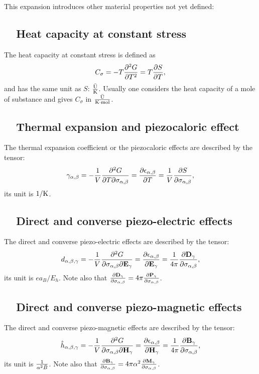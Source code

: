 \documentclass[12pt,a4paper,twoside]{report}
\begin{document}
{This expansion introduces other material properties not yet defined:
\subsection{\color{web-blue}\ \ Heat capacity at constant stress}
The heat capacity at constant stress is defined as
\begin{equation}
C_\sigma= - T {\partial^2 G \over \partial T^2} = 
T {\partial S \over \partial T},
\end{equation}
and has the same unit as $S$: ${\rm \bar U} \over {\rm K}$. Usually one considers the heat
capacity of a mole of substance and gives $C_\sigma$ in 
${{\rm \bar U} \over {\rm K} \cdot {\rm mol}}$.

\subsection{\color{web-blue}\ \ Thermal expansion and piezocaloric effect}
The thermal expansion coefficient or the piezocaloric effects are
described by the tensor:
\begin{equation}
\gamma_{\alpha,\beta}=-{1\over V} {\partial^2 G \over \partial T 
\partial \sigma_{\alpha,\beta}}={\partial \epsilon_{\alpha,\beta} \over 
\partial T}= {1\over V}
{\partial S \over \partial \sigma_{\alpha,\beta}},
\end{equation}
its unit is $1/{\rm K}$.

\subsection{\color{web-blue}\ \ Direct and converse piezo-electric effects}
The direct and converse piezo-electric effects are described by the 
tensor:
\begin{equation}
d_{\alpha,\beta,\gamma}=-{1\over V} {\partial^2 G \over
\partial \sigma_{\alpha,\beta} \partial {\bf E}_\gamma}=
{\partial \epsilon_{\alpha,\beta} \over \partial {\bf E}_\gamma}= 
{1\over 4 \pi} {\partial {\bf D}_\gamma \over \partial \sigma_{\alpha,\beta}},
\end{equation}
its unit is $e a_B/E_h$. Note also that 
${\partial {\bf D}_\gamma \over \partial \sigma_{\alpha,\beta}}
=4 \pi {\partial {\bf P}_\gamma \over \partial \sigma_{\alpha,\beta}}$.

\subsection{\color{web-blue}\ \ Direct and converse piezo-magnetic effects}
The direct and converse piezo-magnetic effects are described by the 
tensor:
\begin{equation}
\hat h_{\alpha,\beta,\gamma}=-{1\over V} {\partial^2 G \over
\partial \sigma_{\alpha,\beta} \partial {\bf H}_\gamma}= 
{\partial \epsilon_{\alpha,\beta} \over \partial {\bf H}_\gamma}= 
{1 \over 4 \pi}{\partial {\bf B}_\gamma \over \partial \sigma_{\alpha,\beta}},
\end{equation}
its unit is ${1 \over \alpha^2 \bar B}$. Note also that 
${\partial {\bf B}_\gamma \over \partial \sigma_{\alpha,\beta}}
=4\pi \alpha^2 {\partial {\bf M}_\gamma \over \partial \sigma_{\alpha,\beta}}$.

}
\end{document}
